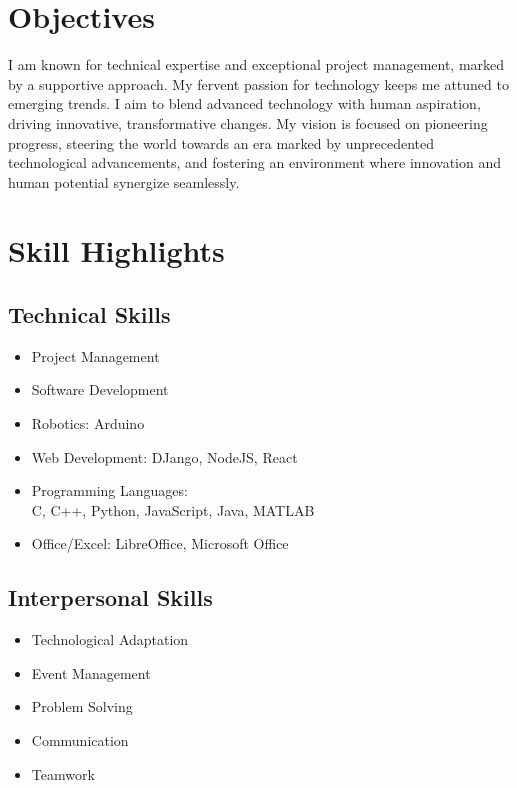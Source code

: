 \documentclass{article}
\begin{document}
\begin{adjustwidth}{0cm}{0cm}
    \vspace{0.5cm}
    \begin{multicols}{2}
        \section*{Objectives}
        I am known for technical expertise and exceptional project management, marked by a supportive approach.
        My fervent passion for technology keeps me attuned to emerging trends. I aim to blend advanced technology with human aspiration, driving innovative, transformative changes. My vision is focused on pioneering progress, steering the world towards an era marked by unprecedented technological advancements, and fostering an environment where innovation and human potential synergize seamlessly.

        \section*{Skill Highlights}
        \subsection*{Technical Skills}
        \begin{itemize}
            \item Project Management
            \item Software Development
            \item Robotics: Arduino
            \item Web Development: DJango, NodeJS, React
            \item Programming Languages: \\
                  C, C++, Python, JavaScript, Java, MATLAB
            \item Office/Excel: LibreOffice, Microsoft Office
        \end{itemize}
        \subsection*{Interpersonal Skills}
        \begin{itemize}
            \item Technological Adaptation
            \item Event Management
            \item Problem Solving
            \item Communication
            \item Teamwork
        \end{itemize}


\end{multicols}
\end{adjustwidth}
\end{document}
